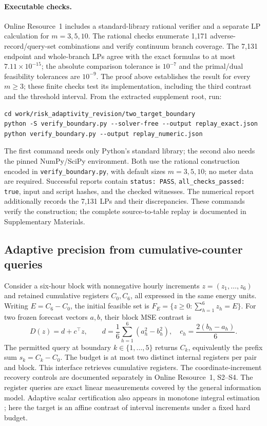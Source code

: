 \documentclass[12pt]{article}
\begin{document}
\paragraph{Executable checks.}
Online Resource~1 includes a standard-library rational verifier and a
separate LP calculation for $m=3,5,10$. The rational checks enumerate
1,171 adverse-record/query-set combinations and verify continuum branch
coverage. The 7,131 endpoint and whole-branch LPs agree with the exact
formulas to at most $7.11\times10^{-15}$; the absolute comparison tolerance
is $10^{-7}$ and the primal/dual feasibility tolerances are $10^{-9}$.
The proof above establishes the result for every $m\geq3$; these finite
checks test its implementation, including the third contrast and the
threshold interval. From the extracted supplement root, run:
\begin{verbatim}
cd work/risk_adaptivity_revision/two_target_boundary
python -S verify_boundary.py --solver-free --output replay_exact.json
python verify_boundary.py --output replay_numeric.json
\end{verbatim}
The first command needs only Python's standard library; the second also
needs the pinned NumPy/SciPy environment. Both use the rational construction
encoded in \texttt{verify\_boundary.py}, with default sizes $m=3,5,10$;
no meter data are required. Successful reports contain
\texttt{status: PASS}, \texttt{all\_checks\_passed: true}, input and script
hashes, and the checked witnesses. The numerical report additionally records
the 7,131 LPs and their discrepancies. These commands verify the construction;
the complete source-to-table replay is documented in Supplementary Materials.
\subsection{Adaptive precision from cumulative-counter queries}
\label{sec:counter-precision-method}
Consider a six-hour block with nonnegative hourly increments
$z=(z_1,\ldots,z_6)$ and retained cumulative registers $C_0,C_6$,
all expressed in the same energy units.
Writing $E=C_6-C_0$, the initial feasible set is
$F_E=\{z\geq0:\sum_{h=1}^6z_h=E\}$.
For two frozen forecast vectors $a,b$, their block MSE contrast is
\[
 D(z)=d+c^\top z,\qquad
 d=\frac16\sum_{h=1}^6(a_h^2-b_h^2),\quad
 c_h=\frac{2(b_h-a_h)}6.
\]
The permitted query at boundary $k\in\{1,\ldots,5\}$ returns
$C_k$, equivalently the prefix sum $s_k=C_k-C_0$.
The budget is at most two distinct internal registers per pair and block.
This interface retrieves cumulative registers. The coordinate-increment
recovery controls are documented separately in Online Resource~1, S2--S4.
The register queries are exact linear measurements covered by the general
information model. Adaptive scalar certification also appears in monotone
integral estimation \citep[Section~4.1]{gaillard2023}; here the target is an
affine contrast of interval increments under a fixed hard budget.
\end{document}

